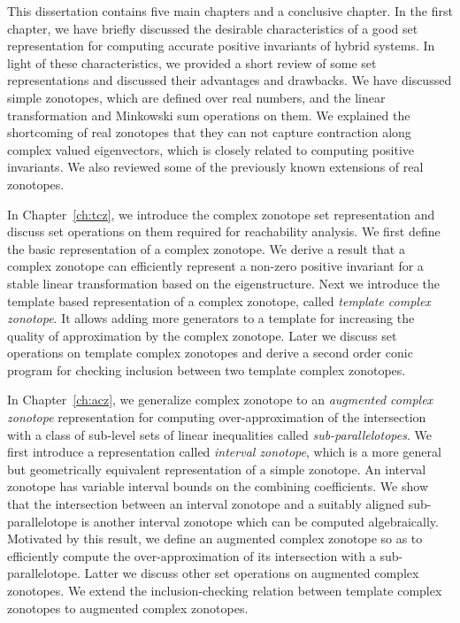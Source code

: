 This dissertation contains five main chapters and a conclusive
chapter.  In the first chapter, we have briefly discussed the
desirable characteristics of a good set representation for computing
accurate positive invariants of hybrid systems.  In light of these
characteristics, we provided a short review of some set
representations and discussed their advantages and drawbacks.  We have
discussed simple zonotopes, which are defined over real numbers, and
the linear transformation and Minkowski sum operations on them. We
explained the shortcoming of real zonotopes that they can not capture
contraction along complex valued eigenvectors, which is closely
related to computing positive invariants.  We also reviewed some of
the previously known extensions of real zonotopes.

In Chapter~\ref{ch:tcz}, we introduce the complex zonotope set
representation and discuss set operations on them required for
reachability analysis.  We first define the basic representation of a
complex zonotope.  We derive a result that a complex zonotope can
efficiently represent a non-zero positive invariant for a stable
linear transformation based on the eigenstructure.  Next we introduce
the template based representation of a complex zonotope, called
\emph{template complex zonotope}.  It allows adding more generators to
a template for increasing the quality of approximation by the complex
zonotope.  Later we discuss set operations on template complex
zonotopes and derive a second order conic program for checking
inclusion between two template complex zonotopes.

In Chapter~\ref{ch:acz}, we generalize complex zonotope to an
\emph{augmented complex zonotope} representation for computing
over-approximation of the intersection with a class of sub-level sets
of linear inequalities called \emph{sub-parallelotopes}.  We first
introduce a representation called \emph{interval zonotope}, which is a
more general but geometrically equivalent representation of a simple
zonotope.  An interval zonotope has variable interval bounds on the
combining coefficients.  We show that the intersection between an
interval zonotope and a suitably aligned sub-parallelotope is another
interval zonotope which can be computed algebraically.  Motivated by
this result, we define an augmented complex zonotope so as to
efficiently compute the over-approximation of its intersection with a
sub-parallelotope.  Latter we discuss other set operations on
augmented complex zonotopes.  We extend the inclusion-checking
relation between template complex zonotopes to augmented complex
zonotopes.

